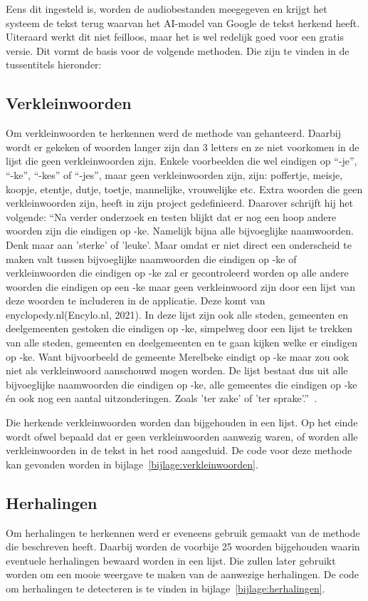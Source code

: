 Eens dit ingesteld is, worden de audiobestanden meegegeven en krijgt het systeem de tekst terug waarvan het AI-model van Google de tekst herkend heeft. Uiteraard werkt dit niet feilloos, maar het is wel redelijk goed voor een gratis versie. Dit vormt de basis voor de volgende methoden. Die zijn te vinden in de tussentitels hieronder:

\subsection{Verkleinwoorden}
Om verkleinwoorden te herkennen werd de methode van \textcite{Standaert2021} gehanteerd. Daarbij wordt er gekeken of woorden langer zijn dan 3 letters en ze niet voorkomen in de lijst die geen verkleinwoorden zijn. Enkele voorbeelden die wel eindigen op ``-je'', ``-ke'', ``-kes'' of ``-jes'', maar geen verkleinwoorden zijn, zijn: poffertje, meisje, koopje, etentje, dutje, toetje, mannelijke, vrouwelijke etc. Extra woorden die geen verkleinwoorden zijn, heeft \textcite{Standaert2021} in zijn project gedefinieerd. Daarover schrijft hij het volgende: 
``Na verder onderzoek en testen blijkt dat er nog een hoop andere woorden zijn die eindigen
op -ke. Namelijk bijna alle bijvoeglijke naamwoorden. Denk maar aan ’sterke’ of ’leuke’.
Maar omdat er niet direct een onderscheid te maken valt tussen bijvoeglijke naamwoorden
die eindigen op -ke of verkleinwoorden die eindigen op -ke zal er gecontroleerd worden op
alle andere woorden die eindigen op een -ke maar geen verkleinwoord zijn door een lijst
van deze woorden te includeren in de applicatie. Deze komt van enyclopedy.nl(Encylo.nl,
2021). In deze lijst zijn ook alle steden, gemeenten en deelgemeenten gestoken die eindigen
op -ke, simpelweg door een lijst te trekken van alle steden, gemeenten en deelgemeenten
en te gaan kijken welke er eindigen op -ke. Want bijvoorbeeld de gemeente Merelbeke
eindigt op -ke maar zou ook niet als verkleinwoord aanschouwd mogen worden. De lijst
bestaat dus uit alle bijvoeglijke naamwoorden die eindigen op -ke, alle gemeentes die
eindigen op -ke én ook nog een aantal uitzonderingen. Zoals ’ter zake’ of ’ter sprake’.''~\autocite{Standaert2021}.

Die herkende verkleinwoorden worden dan bijgehouden in een lijst. Op het einde wordt ofwel bepaald dat er geen verkleinwoorden aanwezig waren, of worden alle verkleinwoorden in de tekst in het rood aangeduid. De code voor deze methode kan gevonden worden in bijlage~\ref{bijlage:verkleinwoorden}.

\subsection{Herhalingen}
Om herhalingen te herkennen werd er eveneens gebruik gemaakt van de methode die \textcite{Standaert2021} beschreven heeft. Daarbij worden de voorbije 25 woorden bijgehouden waarin eventuele herhalingen bewaard worden in een lijst.
Die zullen later gebruikt worden om een mooie weergave te maken van de aanwezige herhalingen.
De code om herhalingen te detecteren is te vinden in bijlage~\ref{bijlage:herhalingen}.

